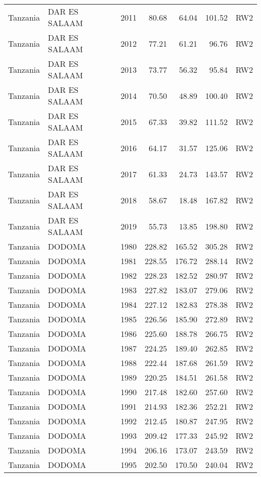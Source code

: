 \begin{longtable}{lllrrrl}
  Tanzania & DAR ES SALAAM & 2011 & 80.68 & 64.04 & 101.52 & RW2 \\ 
  Tanzania & DAR ES SALAAM & 2012 & 77.21 & 61.21 & 96.76 & RW2 \\ 
  Tanzania & DAR ES SALAAM & 2013 & 73.77 & 56.32 & 95.84 & RW2 \\ 
  Tanzania & DAR ES SALAAM & 2014 & 70.50 & 48.89 & 100.40 & RW2 \\ 
  Tanzania & DAR ES SALAAM & 2015 & 67.33 & 39.82 & 111.52 & RW2 \\ 
  Tanzania & DAR ES SALAAM & 2016 & 64.17 & 31.57 & 125.06 & RW2 \\ 
  Tanzania & DAR ES SALAAM & 2017 & 61.33 & 24.73 & 143.57 & RW2 \\ 
  Tanzania & DAR ES SALAAM & 2018 & 58.67 & 18.48 & 167.82 & RW2 \\ 
  Tanzania & DAR ES SALAAM & 2019 & 55.73 & 13.85 & 198.80 & RW2 \\ 
  Tanzania & DODOMA & 1980 & 228.82 & 165.52 & 305.28 & RW2 \\ 
  Tanzania & DODOMA & 1981 & 228.55 & 176.72 & 288.14 & RW2 \\ 
  Tanzania & DODOMA & 1982 & 228.23 & 182.52 & 280.97 & RW2 \\ 
  Tanzania & DODOMA & 1983 & 227.82 & 183.07 & 279.06 & RW2 \\ 
  Tanzania & DODOMA & 1984 & 227.12 & 182.83 & 278.38 & RW2 \\ 
  Tanzania & DODOMA & 1985 & 226.56 & 185.90 & 272.89 & RW2 \\ 
  Tanzania & DODOMA & 1986 & 225.60 & 188.78 & 266.75 & RW2 \\ 
  Tanzania & DODOMA & 1987 & 224.25 & 189.40 & 262.85 & RW2 \\ 
  Tanzania & DODOMA & 1988 & 222.44 & 187.68 & 261.59 & RW2 \\ 
  Tanzania & DODOMA & 1989 & 220.25 & 184.51 & 261.58 & RW2 \\ 
  Tanzania & DODOMA & 1990 & 217.48 & 182.60 & 257.60 & RW2 \\ 
  Tanzania & DODOMA & 1991 & 214.93 & 182.36 & 252.21 & RW2 \\ 
  Tanzania & DODOMA & 1992 & 212.45 & 180.87 & 247.95 & RW2 \\ 
  Tanzania & DODOMA & 1993 & 209.42 & 177.33 & 245.92 & RW2 \\ 
  Tanzania & DODOMA & 1994 & 206.16 & 173.07 & 243.59 & RW2 \\ 
  Tanzania & DODOMA & 1995 & 202.50 & 170.50 & 240.04 & RW2 \\ 

\end{longtable}

